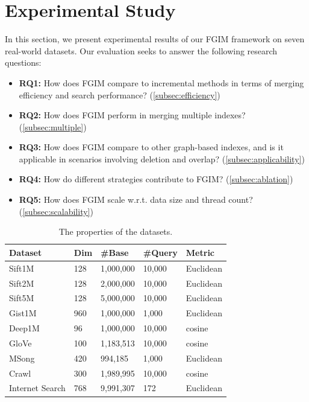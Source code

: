 \documentclass[acmsmall]{acmart}
\theoremstyle{remark}
\theoremstyle{definition}
\begin{document}
\section{Experimental Study}
\label{sec:experimental}

In this section, we present experimental results of our FGIM framework on seven real-world datasets. Our evaluation seeks to answer the following research questions:

\begin{itemize}[leftmargin=0pt,label={}, topsep=0pt, itemsep=0pt]
	\item \textbf{RQ1:} How does FGIM compare to incremental methods in terms of merging efficiency and search performance? (\textsection\ref{subsec:efficiency})
	\item \textbf{RQ2:} How does FGIM perform in merging multiple indexes? (\textsection\ref{subsec:multiple})
	\item \textbf{RQ3:} How does FGIM compare to other graph-based indexes, and is it applicable in scenarios involving deletion and overlap? (\textsection\ref{subsec:applicability})
	\item \textbf{RQ4:} How do different strategies contribute to FGIM? (\textsection\ref{subsec:ablation})
	\item \textbf{RQ5:} How does FGIM scale w.r.t. data size and thread count? (\textsection\ref{subsec:scalability})
\end{itemize}

\begin{table}[t]
	\centering\small
	\caption{The properties of the datasets.}
	\vspace{-1ex}
	\begin{tabular}{l|l|l|l|l}
		\toprule
		\textbf{Dataset} & \textbf{Dim} & \#\textbf{Base} & \#\textbf{Query} & \textbf{Metric} \\
		\midrule
		Sift1M \cite{jegou2010product} & 128 & 1,000,000  & 10,000 & Euclidean \\
		Sift2M \cite{jegou2010product} & 128 & 2,000,000  & 10,000 & Euclidean \\
		Sift5M \cite{jegou2010product} & 128 & 5,000,000  & 10,000 & Euclidean \\
		Gist1M \cite{jegou2010product} & 960 & 1,000,000  & 1,000 & Euclidean \\
		Deep1M \cite{babenko2016efficient} & 96 & 1,000,000 & 10,000 & cosine \\
		GloVe \cite{pennington2014glove} & 100 & 1,183,513 & 10,000 & cosine \\
		MSong \cite{bertin2011million} & 420 & 994,185 & 1,000 & Euclidean  \\
		Crawl \cite{commoncrawl} & 300 & 1,989,995 & 10,000 & cosine \\
		Internet Search \cite{Alipay2025} & 768 & 9,991,307 & 172 & Euclidean \\
		\bottomrule
	\end{tabular}
	\label{tab:dataset}
\end{table}
\end{document}
